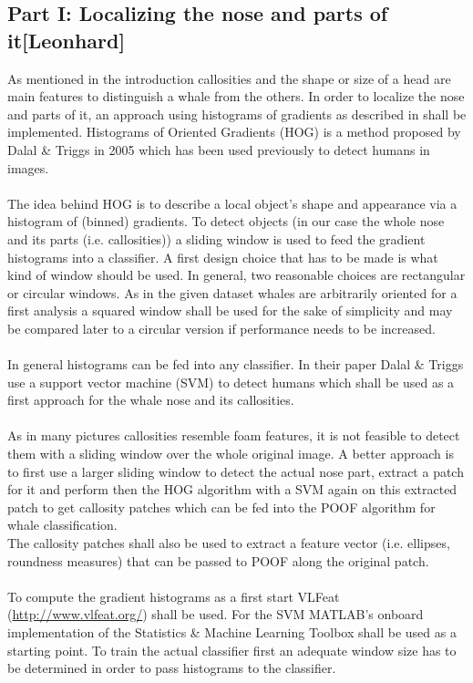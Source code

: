\documentclass[11pt,a4paper,oneside]{article}
\begin{document}
\subsection*{Part I: Localizing the nose and parts of it[Leonhard]}
As mentioned in the introduction callosities and the shape or size of a head are main features to distinguish a whale from the others. In order to localize the nose and parts of it, an approach using histograms of gradients as described in \citep{dalal2005histograms}
shall be implemented. Histograms of Oriented Gradients (HOG) is a method proposed by Dalal \& Triggs in 2005 which has been used previously to detect humans in images. 
\\
\\
The idea behind HOG is to describe a local object's shape and appearance via a histogram of (binned) gradients. To detect objects (in our case the whole nose and its parts (i.e. callosities)) a sliding window is used to feed the gradient histograms into a classifier. A first design choice that has to be made is what kind of window should be used. In general, two reasonable choices are rectangular or circular windows. As in the given dataset whales are arbitrarily oriented for a first analysis a squared window shall be used for the sake of simplicity and may be compared later to a circular version if performance needs to be increased.
\\
\\
In general histograms can be fed into any classifier. In their paper Dalal \& Triggs use a support vector machine (SVM) to detect humans which shall be used as a first approach for the whale nose and its callosities.
\\
\\
As in many pictures callosities resemble foam features, it is not feasible to detect them with a sliding window over the whole original image. A better approach is to first use a larger sliding window to detect the actual nose part, extract a patch for it and perform then the HOG algorithm with a SVM again on this extracted patch to get callosity patches which can be fed into the POOF algorithm for whale classification.
\\
The callosity patches shall also be used to extract a feature vector (i.e. ellipses, roundness measures) that can be passed to POOF along the original patch.
\\
\\
To compute the gradient histograms as a first start VLFeat (\url{http://www.vlfeat.org/}) shall be used. For the SVM MATLAB's onboard implementation of the Statistics \& Machine Learning Toolbox shall be used as a starting point. To train the actual classifier first an adequate window size has to be determined in order to pass histograms to the classifier.
\end{document}
